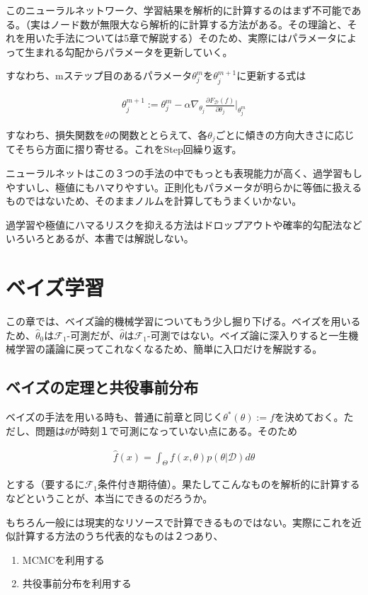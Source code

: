 \documentclass[dvipdfmx, a4paper]{jsarticle}
\begin{document}
このニューラルネットワーク、学習結果を解析的に計算するのはまず不可能である。（実はノード数が無限大なら解析的に計算する方法がある。その理論と、それを用いた手法については5章で解説する）そのため、実際にはパラメータによって生まれる勾配からパラメータを更新していく。

すなわち、mステップ目のあるパラメータ$\theta^m_j$を$\theta^{m+1}_j$に更新する式は

\begin{align}
\theta^{m+1}_j:=\theta^m_j-\alpha\nabla_{\theta_j}\frac{\partial F_\mathcal{D}(f)}{\partial \theta_j}|_{\theta^m_j}
\end{align}

すなわち、損失関数を$\theta$の関数ととらえて、各$\theta_j$ごとに傾きの方向大きさに応じてそちら方面に摺り寄せる。これをStep回繰り返す。

ニューラルネットはこの３つの手法の中でもっとも表現能力が高く、過学習もしやすいし、極値にもハマりやすい。正則化もパラメータが明らかに等価に扱えるものではないため、そのままノルムを計算してもうまくいかない。

過学習や極値にハマるリスクを抑える方法はドロップアウトや確率的勾配法などいろいろとあるが、本書では解説しない。

\newpage
\section{ベイズ学習}
この章では、ベイズ論的機械学習についてもう少し掘り下げる。ベイズを用いるため、$\hat{\theta}_0$は$\mathcal{F}_1$-可測だが、$\hat{\theta}$は$\mathcal{F}_1$-可測ではない。ベイズ論に深入りすると一生機械学習の議論に戻ってこれなくなるため、簡単に入口だけを解説する。


\subsection{ベイズの定理と共役事前分布}
ベイズの手法を用いる時も、普通に前章と同じく$\theta^*(\theta):=f$を決めておく。ただし、問題は$\theta$が時刻１で可測になっていない点にある。そのため

\begin{align}
\hat{f}(x)=\int_\Theta f(x,\theta)p(\theta|\mathcal{D})d\theta
\end{align}

とする（要するに$\mathcal{F}_1$条件付き期待値）。果たしてこんなものを解析的に計算するなどということが、本当にできるのだろうか。

もちろん一般には現実的なリソースで計算できるものではない。実際にこれを近似計算する方法のうち代表的なものは２つあり、
\begin{enumerate}
\item MCMCを利用する
\item 共役事前分布を利用する
\end{enumerate}
\end{document}
